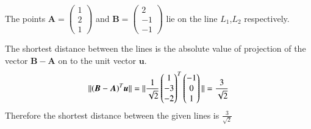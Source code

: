 \documentclass[journal,12pt,twocolumn]{IEEEtran}
\newcommand{\norm}[1]{\| #1 \|}
\begin{document}
The points $\bm{A}=\begin{pmatrix}1\\2\\1\end{pmatrix}$ and $\bm{B}=\begin{pmatrix}2\\-1\\-1\end{pmatrix}$ lie on the line $L_1$,$L_2$ respectively.\par
The shortest distance between the lines is the absolute value of projection of the vector $\bm{B}-\bm{A}$ on to the unit vector $\bm{u}$.
\begin{equation}
    \norm{(\bm{B}-\bm{A})^T\bm{u}}\\
    =\norm{\frac{1}{\sqrt{2}}\begin{pmatrix}1\\-3\\-2\end{pmatrix}^T\begin{pmatrix}-1\\0\\1\end{pmatrix}}\\
    =\frac{3}{\sqrt{2}}\notag
\end{equation}
Therefore the shortest distance between the given lines is $\frac{3}{\sqrt{2}}$
\end{document}
